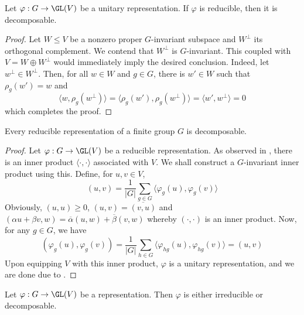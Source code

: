 \begin{lemma}
    Let $\varphi: G\to\GL(V)$ be a unitary representation. If $\varphi$ is reducible, then it is decomposable.
\end{lemma}
\begin{proof}
    Let $W\le V$ be a nonzero proper $G$-invariant subspace and $W^\perp$ its orthogonal complement. We contend that $W^\perp$ is $G$-invariant. This coupled with $V = W\oplus W^\perp$ would immediately imply the desired conclusion. Indeed, let $w^\perp\in W^\perp$. Then, for all $w\in W$ and $g\in G$, there is $w'\in W$ such that $\rho_g(w') = w$ and 
    \begin{equation*}
        \langle w,\rho_g(w^\perp)\rangle = \langle\rho_g(w'),\rho_g(w^\perp)\rangle = \langle w', w^\perp\rangle = 0
    \end{equation*}
    which completes the proof.
\end{proof}

\begin{proposition}
    Every reducible representation of a finite group $G$ is decomposable.
\end{proposition}
\begin{proof}
    Let $\varphi: G\to\GL(V)$ be a reducible representation. As observed in , there is an inner product $\langle\cdot,\cdot\rangle$ associated with $V$. We shall construct a $G$-invariant inner product using this. Define, for $u,v\in V$,
    \begin{equation*}
        (u,v) = \frac{1}{|G|}\sum_{g\in G}\langle\varphi_g(u),\varphi_g(v)\rangle
    \end{equation*}
    Obviously, $(u,u)\ge 0$, $(u,v) = \overline{(v,u)}$ and $(\alpha u + \beta v, w) = \overline\alpha(u, w) + \overline\beta(v, w)$ whereby $(\cdot,\cdot)$ is an inner product. Now, for any $g\in G$, we have 
    \begin{equation*}
        (\varphi_g(u),\varphi_g(v)) = \frac{1}{|G|}\sum_{h\in G}\langle\varphi_{hg}(u),\varphi_{hg}(v)\rangle = (u,v)
    \end{equation*}
    Upon equipping $V$ with this inner product, $\varphi$ is a unitary representation, and we are done due to .
\end{proof}

\begin{corollary}
    Let $\varphi: G\to\GL(V)$ be a representation. Then $\varphi$ is either irreducible or decomposable.
\end{corollary}

